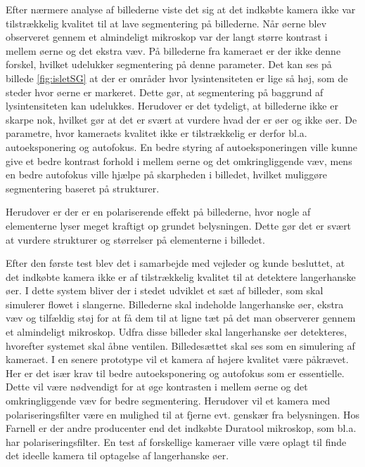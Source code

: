 Efter nærmere analyse af billederne viste det sig at det indkøbte kamera ikke var tilstrækkelig kvalitet til at lave segmentering på billederne. Når øerne blev observeret gennem et almindeligt mikroskop var der langt større kontrast i mellem øerne og det ekstra væv. På billederne fra kameraet er der ikke denne forskel, hvilket udelukker segmentering på denne parameter. Det kan ses på billede \ref{fig:isletSG} at der er områder hvor lysintensiteten er lige så høj, som de steder hvor øerne er markeret. Dette gør, at segmentering på baggrund af lysintensiteten kan udelukkes. Herudover er det tydeligt, at billederne ikke er skarpe nok, hvilket gør at det er svært at vurdere hvad der er øer og ikke øer. De parametre, hvor kameraets kvalitet ikke er tilstrækkelig er derfor bl.a. autoeksponering og autofokus. En bedre styring af autoeksponeringen ville kunne give et bedre kontrast forhold i mellem øerne og det omkringliggende væv, mens en bedre autofokus ville hjælpe på skarpheden i billedet, hvilket muliggøre segmentering baseret på strukturer.

Herudover er der er en polariserende effekt på billederne, hvor nogle af elementerne lyser meget kraftigt op grundet belysningen. Dette gør det er svært at vurdere strukturer og størrelser på elementerne i billedet. 

Efter den første test blev det i samarbejde med vejleder og kunde besluttet, at det indkøbte kamera ikke er af tilstrækkelig kvalitet til at detektere langerhanske øer. I dette system bliver der i stedet udviklet et sæt af billeder, som skal simulerer flowet i slangerne. Billederne skal indeholde langerhanske øer, ekstra væv og tilfældig støj for at få dem til at ligne tæt på det man observerer gennem et almindeligt mikroskop. Udfra disse billeder skal langerhanske øer detekteres, hvorefter systemet skal åbne ventilen. Billedesættet skal ses som en simulering af kameraet. I en senere prototype vil et kamera af højere kvalitet være påkrævet. Her er det især krav til bedre autoeksponering og autofokus som er essentielle. Dette vil være nødvendigt for at øge kontrasten i mellem øerne og det omkringliggende væv for bedre segmentering. Herudover vil et kamera med polariseringsfilter være en mulighed til at fjerne evt. genskær fra belysningen. Hos Farnell er der andre producenter end det indkøbte Duratool mikroskop, som bl.a. har polariseringsfilter. En test af forskellige kameraer ville være oplagt til finde det ideelle kamera til optagelse af langerhanske øer. 